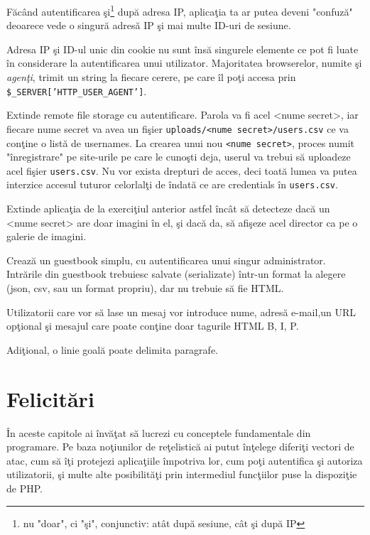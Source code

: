 Făcând autentificarea şi\footnote{nu "doar", ci "şi", conjunctiv: atât
după sesiune, cât şi după IP} după adresa IP, aplicaţia ta ar putea
deveni "confuză" deoarece vede o singură adresă IP şi mai multe
ID-uri de sesiune.

Adresa IP şi ID-ul unic din cookie nu sunt însă singurele elemente
ce pot fi luate în considerare la autentificarea unui utilizator.
Majoritatea browserelor, numite şi \textsl{agenţi}, trimit un string
la fiecare cerere, pe care îl poţi accesa prin \texttt{\$\_SERVER['HTTP\_USER\_AGENT']}.

\begin{Exercise}[title={O schemă de autentificare ieşită din comun},difficulty=2]
Extinde {\glqq}remote file storage{\grqq} cu autentificare.
Parola va fi acel {\glqq}<nume secret>{\grqq}, iar fiecare {\glqq}nume
secret{\grqq} va avea un fişier \texttt{uploads/<nume secret>/users.csv}
ce va conţine o listă de usernames. La crearea unui nou \texttt{<nume secret>},
proces numit "înregistrare" pe site-urile pe care le cunoşti deja,
userul va trebui să uploadeze acel fişier \texttt{users.csv}. Nu vor exista
drepturi de acces, deci toată lumea va putea interzice accesul tuturor celorlalţi
de \^indată ce are credentials \^in \texttt{users.csv}.
\end{Exercise}

\begin{Exercise}[title={Remote file storage cu galerie de imagini}]
Extinde aplicaţia de la exerciţiul anterior astfel încât să detecteze
dacă un {\glqq}<nume secret>{\grqq} are doar imagini în el, şi dacă
da, să afişeze acel director ca pe o galerie de imagini.
\end{Exercise}

\begin{Exercise}[title={Guestbook I}]
Crează un guestbook simplu, cu autentificarea unui singur
administrator. Intrările din guestbook trebuiesc salvate (serializate)
într-un format la alegere (json, csv, sau un format propriu), dar
nu trebuie să fie HTML.

Utilizatorii care vor să lase un mesaj vor introduce nume, adresă e-mail,un 
URL opţional şi mesajul care poate conţine doar tagurile HTML B, I, P.

Adiţional, o linie goală poate delimita paragrafe.
\end{Exercise}

\section{Felicitări}
În aceste capitole ai învăţat să lucrezi cu conceptele fundamentale
din programare. Pe baza noţiunilor de reţelistică ai putut înţelege
diferiţi vectori de atac, cum să îţi protejezi aplicaţiile împotriva
lor, cum poţi autentifica şi autoriza utilizatorii, şi multe
alte posibilităţi prin intermediul funcţiilor puse la dispoziţie de
PHP.

